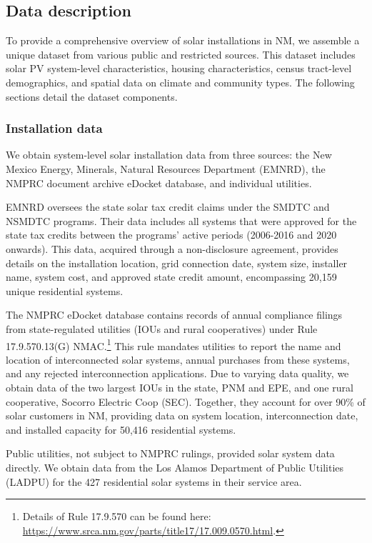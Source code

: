 \documentclass[11pt,twoside,letterpaper]{article}
\begin{document}
\subsection{Data description}
\label{section:data_collect}

To provide a comprehensive overview of solar installations in NM, we assemble a unique dataset from various public and restricted sources. This dataset includes solar PV system-level characteristics, housing characteristics, census tract-level demographics, and spatial data on climate and community types. The following sections detail the dataset components.

\subsubsection{Installation data}

We obtain system-level solar installation data from three sources: the New Mexico Energy, Minerals, Natural Resources Department (EMNRD), the NMPRC document archive eDocket database, and individual utilities. 

EMNRD oversees the state solar tax credit claims under the SMDTC and NSMDTC programs. Their data includes all systems that were approved for the state tax credits between the programs' active periods (2006-2016 and 2020 onwards). This data, acquired through a non-disclosure agreement, provides details on the installation location, grid connection date, system size, installer name, system cost, and approved state credit amount, encompassing 20,159 unique residential systems.

The NMPRC eDocket database contains records of annual compliance filings from state-regulated utilities (IOUs and rural cooperatives) under Rule 17.9.570.13(G) NMAC.\footnote{Details of Rule 17.9.570 can be found here: \url{https://www.srca.nm.gov/parts/title17/17.009.0570.html}.} This rule mandates utilities to report the name and location of interconnected solar systems, annual purchases from these systems, and any rejected interconnection applications. Due to varying data quality, we obtain data of the two largest IOUs in the state, PNM and EPE, and one rural cooperative, Socorro Electric Coop (SEC). Together, they account for over 90\% of solar customers in NM, providing data on system location, interconnection date, and installed capacity for 50,416 residential systems.

Public utilities, not subject to NMPRC rulings, provided solar system data directly. We obtain data from the Los Alamos Department of Public Utilities (LADPU) for the 427 residential solar systems in their service area.
\end{document}
